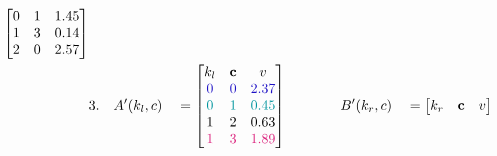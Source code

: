 \begin{figure}[H]
\begin{alignat*}{5}
\begin{bmatrix}
                                                               0   & 1 & 1.45 \\
                                                               1   & 3 & 0.14 \\
                                                               2   & 0 & 2.57 \\
                                                           \end{bmatrix}
        \\
         & 3.          &              & A'(k_l, c)     &                                                                                      & = \begin{bmatrix}
                                                                                                                                                      k_l                      & \textbf{c}               & v                           \\
                                                                                                                                                      \color{blind-blue}0      & \color{blind-blue}0      & \color{blind-blue}2.37      \\
                                                                                                                                                      \color{blind-turquoise}0 & \color{blind-turquoise}1 & \color{blind-turquoise}0.45 \\
                                                                                                                                                      1                        & 2                        & 0.63                        \\
                                                                                                                                                      \color{blind-purple}1    & \color{blind-purple}3    & \color{blind-purple}1.89    \\
                                                                                                                                                  \end{bmatrix}
         &             & \qquad \quad B'(k_r, c)   &                & = \begin{bmatrix}
                                                               k_r                      & \textbf{c}               & v                           \\

\end{bmatrix}
\end{alignat*}
\end{figure}
